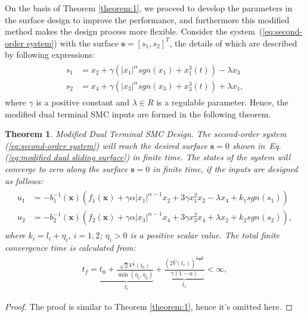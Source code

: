 \documentclass[3p]{elsarticle}
\theoremstyle{plain}
\newtheorem{mythm}{Theorem}
\theoremstyle{remark}
\begin{document}
On the basis of Theorem \ref{theorem:1}, we proceed to develop the parameters in the surface design to improve the performance, and furthermore this modified method makes the design process more flexible. Consider the system~(\ref{eq:second-order system}) with the surface $\bm s = [s_1,s_2]^T$, the details of which are described by following expressions:
\begin{align}
\begin{split}
s_1 &= x_2+\gamma(\vert x_1\vert^{\alpha} sgn(x_1)+x_1^3(t))-\lambda x_3\\
s_2 &= x_4+\gamma(\vert x_3\vert^{\alpha} sgn(x_3)+x_3^3(t))+\lambda x_1,\label{eq:modified dual sliding surface}
\end{split}
\end{align}
where $\gamma$ is a positive constant and $\lambda\in R$ is a regulable parameter. Hence, the modified dual terminal SMC inputs are formed in the following theorem.
\begin{mythm}\label{theorem:2}Modified Dual Terminal SMC Design.
The second-order system (\ref{eq:second-order system}) will reach the desired surface $\bm s = 0$ shown in~Eq. (\ref{eq:modified dual sliding surface}) in finite time. The states of the system will converge to zero along the surface $\bm s=0$ in finite time, if the inputs are designed as follows:
\begin{align}
\begin{split}
u_1 &= -b_1^{-1}(\bm x)(f_1(\bm x)+\gamma\alpha\vert x_1\vert^{\alpha-1}x_2+3\gamma x_1^2x_2-\lambda x_4+k_1sgn(s_1))\\
u_2 &= -b_2^{-1}(\bm x)(f_2(\bm x)+\gamma\alpha\vert x_3\vert^{\alpha-1}x_4+3\gamma x_3^2x_4+\lambda x_2+k_2sgn(s_2)),\label{eq:modified input}
\end{split}
\end{align}
where $k_i = l_i+\eta_i$, $i=1,2$; $\eta_i>0$ is a positive scalar value. The total finite convergence time is calculated from:
\begin{align}
t_f = \underbrace{t_0+\frac{\sqrt{2}V^{\frac{1}{2}}(t_0)}{\min(\eta_1,\eta_2)}}_{t_r}+\underbrace{\frac{(2\hat V(t_r))^{\frac{1-\alpha}{2}}}{\gamma(1-\alpha)}}_{t_s}<\infty,\label{eq:total convergence time}
\end{align}
\end{mythm}
\begin{proof}
The proof is similar to Theorem \ref{theorem:1}, hence it's omitted here.
\end{proof}
\end{document}
